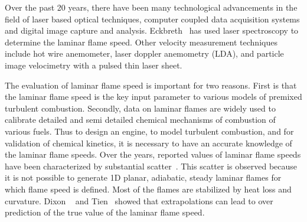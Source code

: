  Over the past 20 years, there have been many technological
advancements in the field of laser based optical techniques, computer
coupled data acquisition systems and digital image capture and
analysis. Eckbreth~\cite{eckbreth} has used laser spectroscopy to
determine the laminar flame speed. Other velocity measurement
techniques include hot wire anemometer, laser doppler anemometry (LDA),
and particle image velocimetry with a pulsed thin laser sheet.


 The evaluation of laminar flame speed is important for 
two reasons. First is that the laminar flame speed is the key
input parameter to various models of premixed turbulent
combustion. Secondly, data on laminar flames are widely used to calibrate
detailed and semi detailed chemical mechanisms of combustion of
various fuels. Thus to design an engine, to model turbulent combustion,
and for validation of chemical kinetics, it is necessary to have an
accurate knowledge of the laminar flame speeds. Over the years,
reported values of laminar flame speeds have been characterized by
substantial scatter~\cite{Andrew}. This scatter is observed because it
is not possible to generate 1D planar, adiabatic, steady laminar
flames for which flame speed is defined. Most of the flames are
stabilized by heat loss and curvature. 
Dixon ~\cite{dixon} and Tien~\cite{tien} showed that
extrapolations can lead to over prediction of the true value of the laminar
flame speed.

